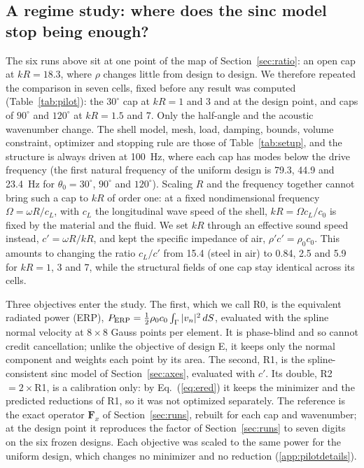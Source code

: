 \documentclass[preprint,12pt]{elsarticle}
\begin{document}
\subsection{A regime study: where does the sinc model stop being enough?}
\label{sec:pilot}
The six runs above sit at one point of the map of Section~\ref{sec:ratio}: an open cap at $kR=18.3$, where $\rho$ changes little from design to design. We therefore repeated the comparison in seven cells, fixed before any result was computed (Table~\ref{tab:pilot}): the $30^\circ$ cap at $kR=1$ and 3 and at the design point, and caps of $90^\circ$ and $120^\circ$ at $kR=1.5$ and 7. Only the half-angle and the acoustic wavenumber change. The shell model, mesh, load, damping, bounds, volume constraint, optimizer and stopping rule are those of Table~\ref{tab:setup}, and the structure is always driven at 100~Hz, where each cap has modes below the drive frequency (the first natural frequency of the uniform design is 79.3, 44.9 and 23.4~Hz for $\theta_0=30^\circ$, $90^\circ$ and $120^\circ$). %
Scaling $R$ and the frequency together cannot bring such a cap to $kR$ of order one: at a fixed nondimensional frequency $\Omega=\omega R/c_L$, with $c_L$ the longitudinal wave speed of the shell, $kR=\Omega c_L/c_0$ is fixed by the material and the fluid. We set $kR$ through an effective sound speed instead, $c'=\omega R/kR$, and kept the specific impedance of air, $\rho'c'=\rho_0c_0$. This amounts to changing the ratio $c_L/c'$ from 15.4 (steel in air) to 0.84, 2.5 and 5.9 for $kR=1$, 3 and 7, while the structural fields of one cap stay identical across its cells. %


Three objectives enter the study. The first, which we call R0, is the equivalent radiated power (ERP), $P_{\rm ERP}=\tfrac12\rho_0c_0\int_\Gamma|v_n|^2\,dS$, evaluated with the spline normal velocity at $8\times8$ Gauss points per element. It is phase-blind and so cannot credit cancellation; unlike the objective of design E, it keeps only the normal component and weights each point by its area. %
The second, R1, is the spline-consistent sinc model of Section~\ref{sec:axes}, evaluated with $c'$. Its double, R2 $=2\times$R1, is a calibration only: by Eq.~(\ref{eq:ered}) it keeps the minimizer and the predicted reductions of R1, so it was not optimized separately. The reference is the exact operator $\mathbf F_x$ of Section~\ref{sec:runs}, rebuilt for each cap and wavenumber; at the design point it reproduces the factor of Section~\ref{sec:runs} to seven digits on the six frozen designs. %
Each objective was scaled to the same power for the uniform design, which changes no minimizer and no reduction (\ref{app:pilotdetails}).
\end{document}
